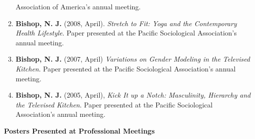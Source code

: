 \documentclass[
]{article}
\begin{document}
\begin{enumerate}
  Association of America's annual meeting.
\item
  \textbf{Bishop, N. J.} (2008, April). \emph{Stretch to Fit: Yoga and
  the Contemporary Health Lifestyle}. Paper presented at the Pacific
  Sociological Association's annual meeting.
\item
  \textbf{Bishop, N. J.} (2007, April) \emph{Variations on Gender
  Modeling in the Televised Kitchen}. Paper presented at the Pacific
  Sociological Association's annual meeting.
\item
  \textbf{Bishop, N. J.} (2005, April), \emph{Kick It up a Notch:
  Masculinity, Hierarchy and the Televised Kitchen}. Paper presented at
  the Pacific Sociological Association's annual meeting.
\end{enumerate}

\textbf{Posters Presented at Professional Meetings}
\end{document}
